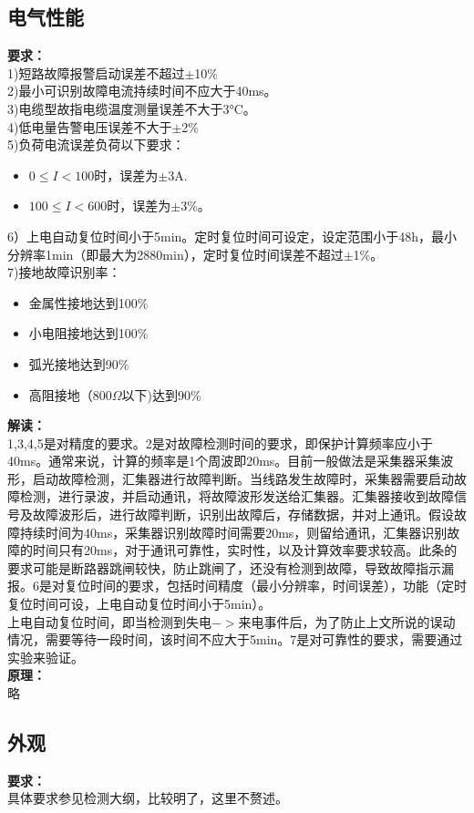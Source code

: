 \documentclass{article}
\begin{document}
\begin{CJK}{UTF8}{gbsn}
\subsection{ 电气性能}
	\par
	\textbf{要求：}\\
	1)短路故障报警启动误差不超过$\pm$10\%\\
	2)最小可识别故障电流持续时间不应大于40ms。\\
	3)电缆型故指电缆温度测量误差不大于3°C。\\
	4)低电量告警电压误差不大于$\pm$2\%\\
	5)负荷电流误差负荷以下要求：
	\begin{itemize}
			\item $0\leq I < 100$时，误差为$\pm$3A.
			\item$100\leq I < 600$时，误差为$\pm$3\%。
	\end{itemize}
	6）上电自动复位时间小于5min。定时复位时间可设定，设定范围小于48h，最小分辨率1min（即最大为2880min），定时复位时间误差不超过$\pm$1\%。\\
	7)接地故障识别率：
	\begin{itemize}
			\item 金属性接地达到100\%
			\item 小电阻接地达到100\%
			\item 弧光接地达到90\%
			\item 高阻接地（800$\Omega$以下)达到90\%
	\end{itemize}
	\textbf{解读：}\\
	1,3,4,5是对精度的要求。2是对故障检测时间的要求，即保护计算频率应小于40ms。通常来说，计算的频率是1个周波即20ms。目前一般做法是采集器采集波形，启动故障检测，汇集器进行故障判断。当线路发生故障时，采集器需要启动故障检测，进行录波，并启动通讯，将故障波形发送给汇集器。汇集器接收到故障信号及故障波形后，进行故障判断，识别出故障后，存储数据，并对上通讯。假设故障持续时间为40ms，采集器识别故障时间需要20ms，则留给通讯，汇集器识别故障的时间只有20ms，对于通讯可靠性，实时性，以及计算效率要求较高。此条的要求可能是断路器跳闸较快，防止跳闸了，还没有检测到故障，导致故障指示漏报。6是对复位时间的要求，包括时间精度（最小分辨率，时间误差），功能（定时复位时间可设，上电自动复位时间小于5min）。\\上电自动复位时间，即当检测到失电$->$来电事件后，为了防止上文所说的误动情况，需要等待一段时间，该时间不应大于5min。7是对可靠性的要求，需要通过实验来验证。\\
	\textbf{原理：}\\
	略
\subsection{ 外观 }
	\par
	\textbf{要求：}\\
	具体要求参见检测大纲，比较明了，这里不赘述。


\end{CJK}
\end{document}
